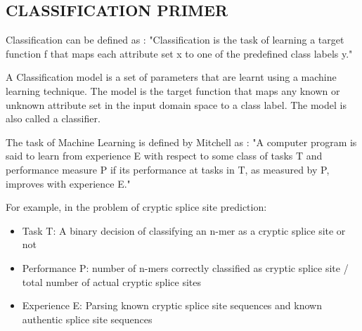 	
	\subsection{CLASSIFICATION PRIMER}
	Classification can be defined as : "Classification is the task of learning a target function f that maps each attribute set x to one of the predefined class labels y." \cite{pangning} \par
	A Classification model is a set of parameters that are learnt using a machine learning technique. The model is the target function that maps any known or unknown attribute set in the input domain space to a class label. The model is also called a classifier. \par
	The task of Machine Learning is defined by Mitchell as : "A computer program is said to learn from experience E with respect to some class of tasks T and performance measure P if its performance at tasks in T, as measured by P, improves with experience E." \par

	For example, in the problem of cryptic splice site prediction:
	\begin{itemize}
	\item Task T: A binary decision of classifying an n-mer as a cryptic splice site or not
	\item Performance P: number of n-mers correctly classified as cryptic splice site / total number of actual cryptic splice sites
	\item Experience E: Parsing known cryptic splice site sequences and known authentic splice site sequences
    \end{itemize}

